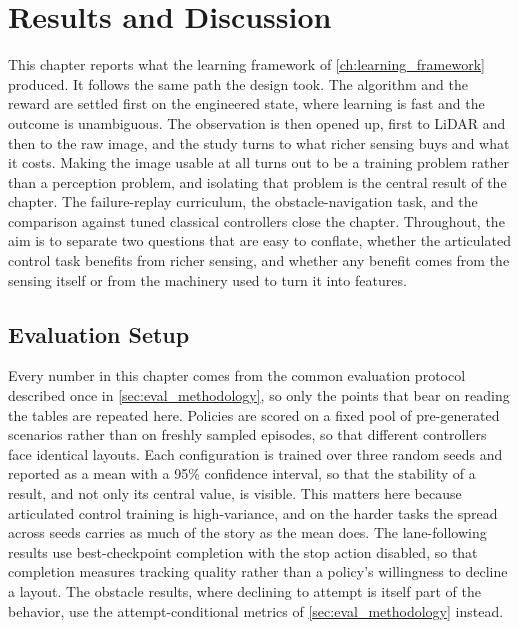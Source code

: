 \chapter{Results and Discussion}
\label{ch:results}

\newcommand{\pending}[1]{\textcolor{red}{[pending: #1]}}

This chapter reports what the learning framework of \cref{ch:learning_framework} produced. It follows the same path the design took. The algorithm and the reward are settled first on the engineered state, where learning is fast and the outcome is unambiguous. The observation is then opened up, first to LiDAR and then to the raw image, and the study turns to what richer sensing buys and what it costs. Making the image usable at all turns out to be a training problem rather than a perception problem, and isolating that problem is the central result of the chapter. The failure-replay curriculum, the obstacle-navigation task, and the comparison against tuned classical controllers close the chapter. Throughout, the aim is to separate two questions that are easy to conflate, whether the articulated control task benefits from richer sensing, and whether any benefit comes from the sensing itself or from the machinery used to turn it into features.

\section{Evaluation Setup}
\label{sec:eval_setup}

Every number in this chapter comes from the common evaluation protocol described once in \cref{sec:eval_methodology}, so only the points that bear on reading the tables are repeated here. Policies are scored on a fixed pool of pre-generated scenarios rather than on freshly sampled episodes, so that different controllers face identical layouts. Each configuration is trained over three random seeds and reported as a mean with a 95\% confidence interval, so that the stability of a result, and not only its central value, is visible. This matters here because articulated control training is high-variance, and on the harder tasks the spread across seeds carries as much of the story as the mean does. The lane-following results use best-checkpoint completion with the stop action disabled, so that completion measures tracking quality rather than a policy's willingness to decline a layout. The obstacle results, where declining to attempt is itself part of the behavior, use the attempt-conditional metrics of \cref{sec:eval_methodology} instead.

